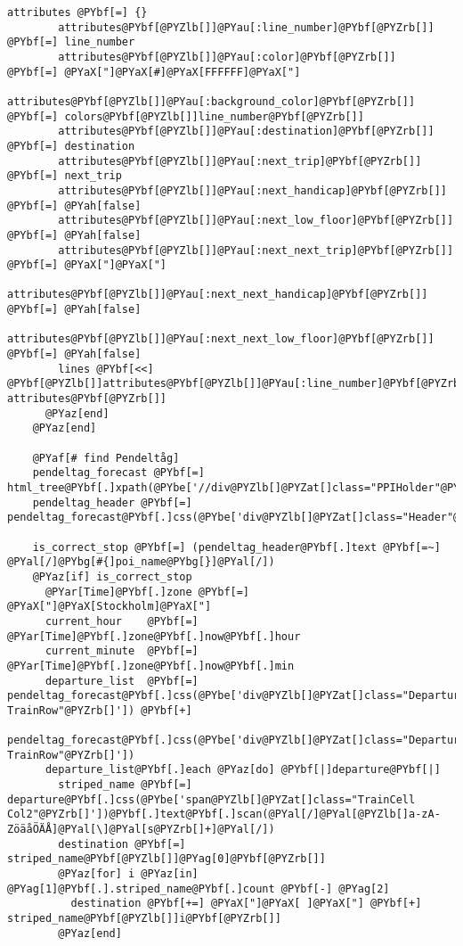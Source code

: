\begin{Verbatim}[commandchars=@\[\]]
        attributes @PYbf[=] {}
        attributes@PYbf[@PYZlb[]]@PYau[:line_number]@PYbf[@PYZrb[]]       @PYbf[=] line_number
        attributes@PYbf[@PYZlb[]]@PYau[:color]@PYbf[@PYZrb[]]             @PYbf[=] @PYaX["]@PYaX[#]@PYaX[FFFFFF]@PYaX["]
        attributes@PYbf[@PYZlb[]]@PYau[:background_color]@PYbf[@PYZrb[]]  @PYbf[=] colors@PYbf[@PYZlb[]]line_number@PYbf[@PYZrb[]]
        attributes@PYbf[@PYZlb[]]@PYau[:destination]@PYbf[@PYZrb[]]       @PYbf[=] destination
        attributes@PYbf[@PYZlb[]]@PYau[:next_trip]@PYbf[@PYZrb[]]         @PYbf[=] next_trip
        attributes@PYbf[@PYZlb[]]@PYau[:next_handicap]@PYbf[@PYZrb[]]        @PYbf[=] @PYah[false]
        attributes@PYbf[@PYZlb[]]@PYau[:next_low_floor]@PYbf[@PYZrb[]]       @PYbf[=] @PYah[false]
        attributes@PYbf[@PYZlb[]]@PYau[:next_next_trip]@PYbf[@PYZrb[]]    @PYbf[=] @PYaX["]@PYaX["]
        attributes@PYbf[@PYZlb[]]@PYau[:next_next_handicap]@PYbf[@PYZrb[]]        @PYbf[=] @PYah[false]
        attributes@PYbf[@PYZlb[]]@PYau[:next_next_low_floor]@PYbf[@PYZrb[]]       @PYbf[=] @PYah[false]
        lines @PYbf[<<] @PYbf[@PYZlb[]]attributes@PYbf[@PYZlb[]]@PYau[:line_number]@PYbf[@PYZrb[]], attributes@PYbf[@PYZrb[]]
      @PYaz[end]
    @PYaz[end]
    
    @PYaf[# find Pendeltåg]
    pendeltag_forecast @PYbf[=] html_tree@PYbf[.]xpath(@PYbe['//div@PYZlb[]@PYZat[]class="PPIHolder"@PYZrb[]'])
    pendeltag_header @PYbf[=] pendeltag_forecast@PYbf[.]css(@PYbe['div@PYZlb[]@PYZat[]class="Header"@PYZrb[]'])@PYbf[.]css(@PYbe['h3'])
    
    is_correct_stop @PYbf[=] (pendeltag_header@PYbf[.]text @PYbf[=~] @PYal[/]@PYbg[#{]poi_name@PYbg[}]@PYal[/])
    @PYaz[if] is_correct_stop
      @PYar[Time]@PYbf[.]zone @PYbf[=] @PYaX["]@PYaX[Stockholm]@PYaX["]
      current_hour    @PYbf[=] @PYar[Time]@PYbf[.]zone@PYbf[.]now@PYbf[.]hour
      current_minute  @PYbf[=] @PYar[Time]@PYbf[.]zone@PYbf[.]now@PYbf[.]min
      departure_list  @PYbf[=]  pendeltag_forecast@PYbf[.]css(@PYbe['div@PYZlb[]@PYZat[]class="Departure TrainRow"@PYZrb[]']) @PYbf[+]
                          pendeltag_forecast@PYbf[.]css(@PYbe['div@PYZlb[]@PYZat[]class="DepartureAlternating TrainRow"@PYZrb[]'])
      departure_list@PYbf[.]each @PYaz[do] @PYbf[|]departure@PYbf[|]
        striped_name @PYbf[=] departure@PYbf[.]css(@PYbe['span@PYZlb[]@PYZat[]class="TrainCell Col2"@PYZrb[]'])@PYbf[.]text@PYbf[.]scan(@PYal[/]@PYal[@PYZlb[]a-zA-ZöäåÖÄÅ]@PYal[\]@PYal[s@PYZrb[]+]@PYal[/])
        destination @PYbf[=] striped_name@PYbf[@PYZlb[]]@PYag[0]@PYbf[@PYZrb[]]
        @PYaz[for] i @PYaz[in] @PYag[1]@PYbf[.].striped_name@PYbf[.]count @PYbf[-] @PYag[2]
          destination @PYbf[+=] @PYaX["]@PYaX[ ]@PYaX["] @PYbf[+] striped_name@PYbf[@PYZlb[]]i@PYbf[@PYZrb[]]
        @PYaz[end]
        

\end{Verbatim}
